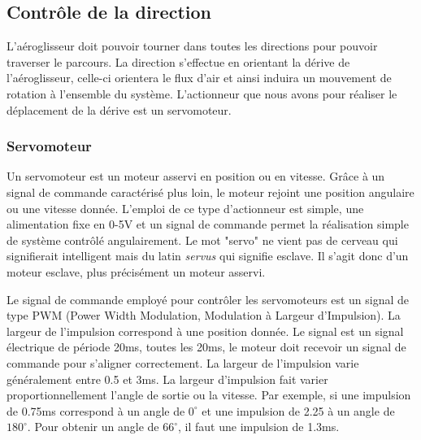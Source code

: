 \documentclass[a4paper,12pt]{report}
\begin{document}
		\vspace{-1em}
	
		\subsection{Contrôle de la direction}
		
		\vspace{-1em}
		
			L'aéroglisseur doit pouvoir tourner dans toutes les directions pour pouvoir traverser le parcours. La direction s'effectue en orientant la dérive de l'aéroglisseur, celle-ci orientera le flux d'air et ainsi induira un mouvement de rotation à l'ensemble du système. L'actionneur que nous avons pour réaliser le déplacement de la dérive est un servomoteur.
			
		\vspace{-1em}
		
			\subsubsection{Servomoteur}
			
			\vspace{-1em}
			
			Un servomoteur est un moteur asservi en position ou en vitesse. Grâce à un signal de commande caractérisé plus loin, le moteur rejoint une position angulaire ou une vitesse donnée. L'emploi de ce type d'actionneur est simple, une alimentation fixe en 0-5V et un signal de commande permet la réalisation simple de système contrôlé angulairement. Le mot "servo" ne vient pas de cerveau qui signifierait intelligent mais du latin \textit{servus} qui signifie esclave. Il s'agit donc d'un moteur esclave, plus précisément un moteur asservi.
			
			Le signal de commande employé pour contrôler les servomoteurs est un signal de type PWM (Power Width Modulation, Modulation à Largeur d'Impulsion). La largeur de l'impulsion correspond à une position donnée. Le signal est un signal électrique de période 20ms, toutes les 20ms, le moteur doit recevoir un signal de commande pour s'aligner correctement. La largeur de l'impulsion varie généralement entre 0.5 et 3ms. La largeur d'impulsion fait varier proportionnellement l'angle de sortie ou la vitesse. Par exemple, si une impulsion de 0.75ms correspond à un angle de $0^{\circ}$ et une impulsion de 2.25 à un angle de $180^{\circ}$. Pour obtenir un angle de $66^{\circ}$, il faut une impulsion de 1.3ms.   
			
\end{document}
